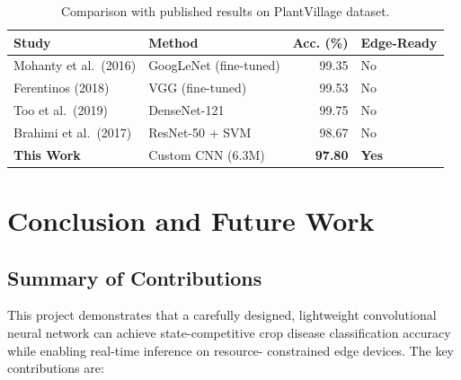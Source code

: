 \documentclass[11pt,a4paper]{article}
\begin{document}
\begin{table}[H]
  \centering
  \caption{Comparison with published results on PlantVillage dataset.}
  \label{tab:comparison}
  \begin{tabular}{@{}llrl@{}}
    \toprule
    \textbf{Study} & \textbf{Method} & \textbf{Acc. (\%)} & \textbf{Edge-Ready} \\
    \midrule
    Mohanty et al.\ (2016) & GoogLeNet (fine-tuned) & 99.35 & No \\
    Ferentinos (2018)      & VGG (fine-tuned)      & 99.53 & No \\
    Too et al.\ (2019)     & DenseNet-121          & 99.75 & No \\
    Brahimi et al.\ (2017) & ResNet-50 + SVM       & 98.67 & No \\
    \textbf{This Work}     & Custom CNN (6.3M)     & \textbf{97.80} & \textbf{Yes} \\
    \bottomrule
  \end{tabular}
\end{table}

\section{Conclusion and Future Work}

\subsection{Summary of Contributions}

This project demonstrates that a carefully designed, lightweight
convolutional neural network can achieve state-competitive crop disease
classification accuracy while enabling real-time inference on resource-
constrained edge devices. The key contributions are:
\end{document}
